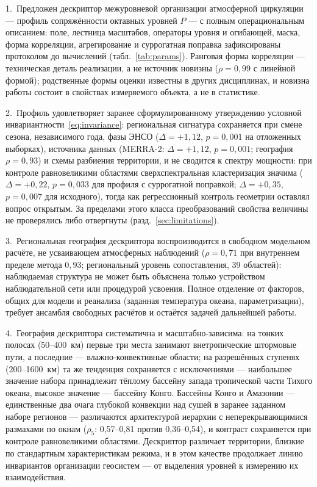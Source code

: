 \documentclass[11pt,a4paper]{article}
\begin{document}
1.~Предложен дескриптор межуровневой организации атмосферной циркуляции --- профиль сопряжённости октавных уровней $P$ --- с полным операциональным описанием: поле, лестница масштабов, операторы уровня и огибающей, маска, форма корреляции, агрегирование и суррогатная поправка зафиксированы протоколом до вычислений (табл.~\ref{tab:params}). Ранговая форма корреляции --- техническая деталь реализации, а не источник новизны ($\rho=0{,}99$ с линейной формой); родственные формы оценки известны в других дисциплинах, и новизна работы состоит в свойствах измеряемого объекта, а не в статистике.

2.~Профиль удовлетворяет заранее сформулированному утверждению условной инвариантности~\eqref{eq:invariance}: региональная сигнатура сохраняется при смене сезона, независимого года, фазы ЭНСО ($\Delta=+1{,}12$, $p=0{,}001$ на отложенных выборках), источника данных (MERRA-2: $\Delta=+1{,}12$, $p=0{,}001$; география $\rho=0{,}93$) и схемы разбиения территории, и не сводится к спектру мощности: при контроле равновеликими областями сверхспектральная кластеризация значима ($\Delta=+0{,}22$, $p=0{,}033$ для профиля с суррогатной поправкой; $\Delta=+0{,}35$, $p=0{,}007$ для исходного), тогда как регрессионный контроль геометрии оставлял вопрос открытым. За пределами этого класса преобразований свойства величины не проверялись либо отвергнуты (разд.~\ref{sec:limitations}).

3.~Региональная география дескриптора воспроизводится в свободном модельном расчёте, не усваивающем атмосферных наблюдений ($\rho=0{,}71$ при внутреннем пределе метода $0{,}93$; региональный уровень сопоставления, 39 областей): наблюдаемая структура не может быть объяснена только устройством наблюдательной сети или процедурой усвоения. Полное отделение от факторов, общих для модели и реанализа (заданная температура океана, параметризации), требует ансамбля свободных расчётов и остаётся задачей дальнейшей работы.

4.~География дескриптора систематична и масштабно-зависима: на тонких полосах (50--400~км) первые три места занимают внетропические штормовые пути, а последние --- влажно-конвективные области; на разрешённых ступенях (200--1600~км) та же тенденция сохраняется с исключениями --- наибольшее значение набора принадлежит тёплому бассейну запада тропической части Тихого океана, высокое значение --- бассейну Конго. Бассейны Конго и Амазонии --- единственные два очага глубокой конвекции над сушей в заранее заданном наборе регионов --- различаются архитектурой иерархии с неперекрывающимися размахами по окнам ($\rho_5$: 0,57--0,81 против 0,36--0,54), и контраст сохраняется при контроле равновеликими областями. Дескриптор различает территории, близкие по стандартным характеристикам режима, и в этом качестве продолжает линию инвариантов организации геосистем --- от выделения уровней к измерению их взаимодействия.
\end{document}
